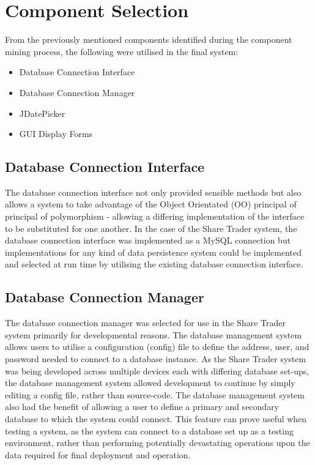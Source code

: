 \documentclass[12pt, a4paper,titlepage]{article}
\begin{document}
\section{Component Selection}
From the previously mentioned components identified  during the
component mining process, the following were utilised in the final system:
\begin{itemize}
\item Database Connection Interface
\item Database Connection Manager
\item JDatePicker
\item GUI Display Forms
\end{itemize}

\subsection{Database Connection Interface}
The database connection interface not only provided sensible methods but also
allows a system to take advantage of the Object Orientated (OO) principal of
principal of polymorphism - allowing a differing implementation of the
interface to be substituted for one another. 
In the case of the Share Trader system, the database connection interface was
implemented as a MySQL connection but implementations for any kind of data
persistence system could be implemented and selected at run time by
utilising the existing database connection interface.

\subsection{Database Connection Manager}
The database connection manager was selected for use in the Share Trader
system primarily for developmental reasons.
The database management system allows users to utilise a configuration
(config) file to define the address, user, and password needed to connect to a
database instance. 
As the Share Trader system was being developed across multiple
devices each with differing database set-ups, the database management system
allowed development to continue by simply editing a config file, rather than
source-code.  
The database management system also had the benefit of
allowing a user to define a primary and secondary database to which the system
could connect. 
This feature can prove useful when testing a system, as the system can connect
to a database set up as a testing environment, rather than performing
potentially devastating operations upon the data required for final deployment
and operation.
\end{document}
